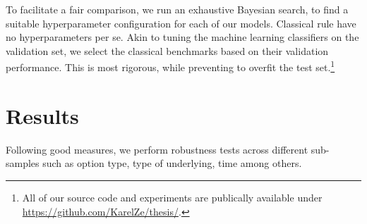 To facilitate a fair comparison, we run an exhaustive Bayesian search, to find a suitable hyperparameter configuration for each of our models. Classical
rule have no hyperparameters per se. Akin to tuning the machine learning classifiers on the validation set, we select the classical benchmarks based on their validation performance. This is most rigorous, while preventing to overfit the test set.\footnote{All of our source code and experiments are publically available under \url{https://github.com/KarelZe/thesis/}.}

\section{Results}

Following good measures, we perform robustness tests across different sub-samples such as option type, type of underlying, time among others. 


